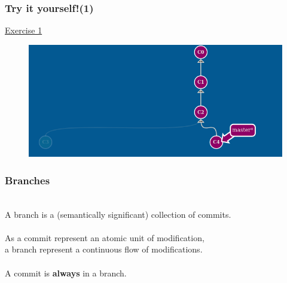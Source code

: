 \documentclass{beamer}
\begin{document}
\begin{frame}
    \frametitle{Try it yourself!(1)}
    \begin{center}
        \href{https://learngitbranching.js.org/?NODEMO\&command=git\%20commit;git\%20commit}{Exercise 1}
    \end{center}
    \begin{figure}
        \includegraphics[scale=0.4]{imgs/ex1.png}
    \end{figure}
\end{frame}


\begin{frame}
    \frametitle{Branches}
    
    \hfill \\
    A branch is a (semantically significant) collection of commits.\\
    \hfill \\
    As a commit represent an atomic unit of modification, \\
    a branch represent a continuous flow of modifications. \\
    \hfill \\
    A commit is \textbf{always} in a branch. 
\end{frame}
\end{document}
